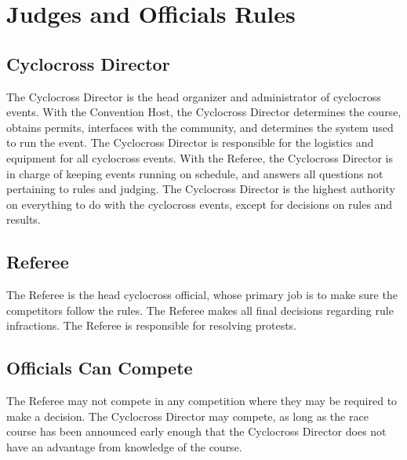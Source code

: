 \chapter{Judges and Officials Rules}

\section{Cyclocross Director}

The Cyclocross Director is the head organizer and administrator of cyclocross events.
With the Convention Host, the Cyclocross Director determines the course, obtains permits, interfaces with the community, and determines the system used to run the event.
The Cyclocross Director is responsible for the logistics and equipment for all cyclocross events.
With the Referee, the Cyclocross Director is in charge of keeping events running on schedule, and answers all questions not pertaining to rules and judging.
The Cyclocross Director is the highest authority on everything to do with the cyclocross events, except for decisions on rules and results.

\section{Referee}

The Referee is the head cyclocross official, whose primary job is to make sure the competitors follow the rules.
The Referee makes all final decisions regarding rule infractions.
The Referee is responsible for resolving protests.

\section{Officials Can Compete}

The Referee may not compete in any competition where they may be required to make a decision.
The Cyclocross Director may compete, as long as the race course has been announced early enough that the Cyclocross Director does not have an advantage from knowledge of the course.

